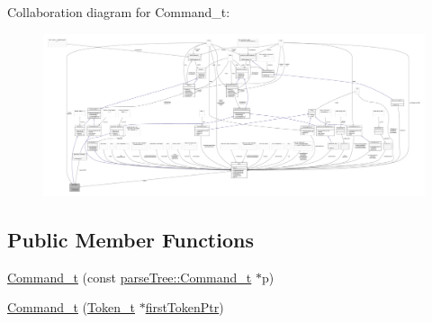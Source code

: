 Collaboration diagram for Command\+\_\+t\+:
\nopagebreak
\begin{figure}[H]
\begin{center}
\leavevmode
\includegraphics[width=350pt]{struct_command__t__coll__graph}
\end{center}
\end{figure}
\subsection*{Public Member Functions}
\begin{DoxyCompactItemize}
\item 
\hyperlink{struct_command__t_ab05de3e9cb41eee9588217de9ee522c5}{Command\+\_\+t} (const \hyperlink{structparse_tree_1_1_command__t}{parse\+Tree\+::\+Command\+\_\+t} $\ast$p)
\item 
\hyperlink{struct_command__t_a04cb783dda3bf66071f86c99c4f38313}{Command\+\_\+t} (\hyperlink{struct_token__t}{Token\+\_\+t} $\ast$\hyperlink{struct_compound_item__t_a4d95dc788120f627e332491589d20c5c}{first\+Token\+Ptr})
\end{DoxyCompactItemize}
